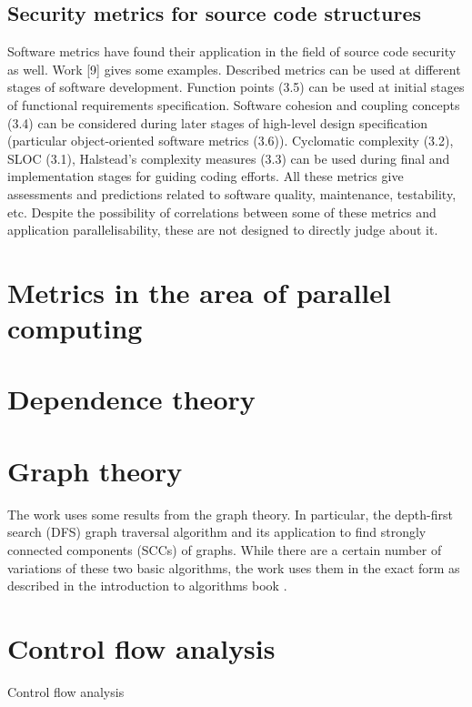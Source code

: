 \subsection{Security metrics for source code structures}
\qquad Software metrics have found their application in the field of source code security as well. Work [9] gives some examples. Described metrics can be used at different stages of software development. Function points (3.5) can be used at initial stages of functional requirements specification. Software cohesion and coupling concepts (3.4) can be considered during later stages of high-level design specification (particular object-oriented software metrics (3.6)). Cyclomatic complexity (3.2), SLOC (3.1), Halstead's complexity measures (3.3) can be used during final and implementation stages for guiding coding efforts. All these metrics give assessments and predictions related to software quality, maintenance, testability, etc. Despite the possibility of correlations between some of these metrics and application parallelisability, these are not designed to directly judge about it.

\section{Metrics in the area of parallel computing}

\section{Dependence theory} \label{background-dependence-theory}
\cite{optimizing-compilers-book}

\section{Graph theory} \label{background-graph-theory}
\qquad The work uses some results from the graph theory. In particular, the depth-first search (DFS) graph traversal algorithm and its application to find strongly connected components (SCCs) of graphs. While there are a certain number of variations of these two basic algorithms, the work uses them in the exact form as described in the introduction to algorithms book \cite{introduction-to-algorithms-book}.

\section{Control flow analysis} \label{background-control-flow-analysis}
\qquad Control flow analysis \cite{advanced-compiler-design-book}

